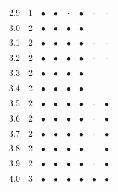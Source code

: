 \begin{table}[H]
\begin{tabular}{rrcccccc}
2.9 & 1 & $\bullet$ & $\bullet$ & $\cdot$ & $\bullet$ & $\cdot$ & $\cdot$ \\
3.0 & 2 & $\bullet$ & $\bullet$ & $\bullet$ & $\bullet$ & $\cdot$ & $\cdot$ \\
3.1 & 2 & $\bullet$ & $\bullet$ & $\bullet$ & $\bullet$ & $\cdot$ & $\cdot$ \\
3.2 & 2 & $\bullet$ & $\bullet$ & $\bullet$ & $\bullet$ & $\cdot$ & $\cdot$ \\
3.3 & 2 & $\bullet$ & $\bullet$ & $\bullet$ & $\bullet$ & $\cdot$ & $\cdot$ \\
3.4 & 2 & $\bullet$ & $\bullet$ & $\bullet$ & $\bullet$ & $\cdot$ & $\cdot$ \\
3.5 & 2 & $\bullet$ & $\bullet$ & $\bullet$ & $\bullet$ & $\cdot$ & $\bullet$ \\
3.6 & 2 & $\bullet$ & $\bullet$ & $\bullet$ & $\bullet$ & $\cdot$ & $\bullet$ \\
3.7 & 2 & $\bullet$ & $\bullet$ & $\bullet$ & $\bullet$ & $\cdot$ & $\bullet$ \\
3.8 & 2 & $\bullet$ & $\bullet$ & $\bullet$ & $\bullet$ & $\cdot$ & $\bullet$ \\
3.9 & 2 & $\bullet$ & $\bullet$ & $\bullet$ & $\bullet$ & $\cdot$ & $\bullet$ \\
4.0 & 3 & $\bullet$ & $\bullet$ & $\bullet$ & $\bullet$ & $\bullet$ & $\bullet$ \\
\bottomrule
\end{tabular}
\end{table}
